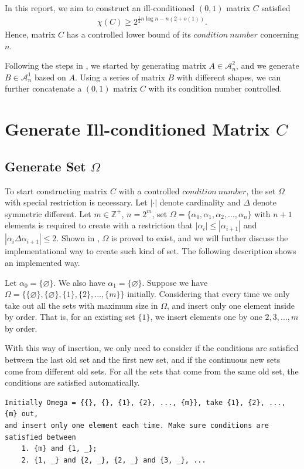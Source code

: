 \documentclass[11pt]{article}
\begin{document}
In this report, we aim to construct an ill-conditioned $(0, 1)$ matrix $C$ satisfied
\begin{align*}
\chi(C) \geq2^{\frac{1}{2}n\log n-n(2+o(1))}.
\end{align*}
Hence, matrix $C$ has a controlled lower bound of its $condition\ number$ concerning $n$. 

Following the steps in \cite{ALON1997133}, we started by generating matrix $A \in \mathcal{A}_n^2$, and we generate $B \in \mathcal{A}_n^1$ based on $A$. Using a series of matrix $B$ with different shapes, we can further concatenate a $(0, 1)$ matrix $C$ with its condition number controlled.



\section{Generate Ill-conditioned Matrix $C$}


\subsection{Generate Set $\Omega$}
To start constructing matrix $C$ with a controlled $condition\ number$, the set $\Omega$ with special restriction is necessary. Let $|\cdot|$ denote cardinality and $\Delta$ denote symmetric different. Let $m\in \mathbb{Z}^{+}$, $n=2^m$, set $\Omega = \{\alpha_0, \alpha_1, \alpha_2, ..., \alpha_n\}$ with $n + 1$ elements is required to create with a restriction that $|\alpha_i| \leq |\alpha_{i+1}|$ and $|\alpha_i \Delta \alpha_{i+1}| \leq 2$. Shown in \cite{doi:10.1137/S0895480192235878}, $\Omega$ is proved to exist, and we will further discuss the implementational way to create such kind of set. The following description shows an implemented way.

Let $\alpha_0=\{\varnothing\}$. We also have $\alpha_1=\{\varnothing\}$. Suppose we have $\Omega = \{\{\varnothing\}, \{\varnothing\}, \{1\}, \{2\}, ..., \{m\}\}$ initially. Considering that every time we only take out all the sets with maximum size in $\Omega$, and insert only one element inside by order. That is, for an existing set $\{1\}$, we insert elements one by one $2, 3, ..., m$ by order.

With this way of insertion, we only need to consider if the conditions are satisfied between the last old set and the first new set, and if the continuous new sets come from different old sets. For all the sets that come from the same old set, the conditions are satisfied automatically.
\begin{lstlisting}
Initially Omega = {{}, {}, {1}, {2}, ..., {m}}, take {1}, {2}, ..., {m} out, 
and insert only one element each time. Make sure conditions are satisfied between
    1. {m} and {1, _}; 
    2. {1, _} and {2, _}, {2, _} and {3, _}, ...
\end{lstlisting}
\end{document}
